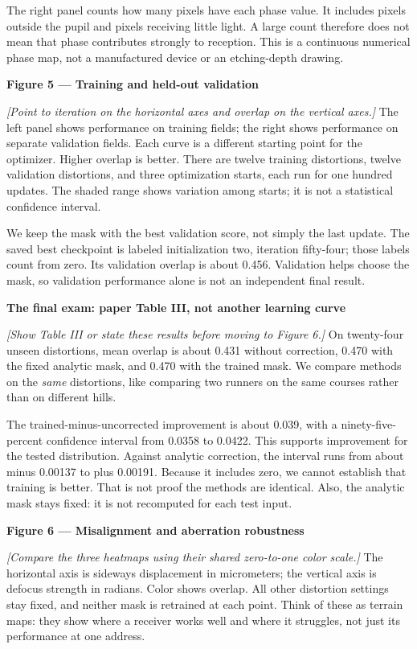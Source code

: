 \documentclass[11pt,letterpaper]{article}
\newcommand{\cue}[1]{\par\textbf{#1}\par}
\newcommand{\stage}[1]{\textit{[#1]}}
\begin{document}
The right panel counts how many pixels have each phase value. It includes pixels outside the pupil and pixels receiving little light. A large count therefore does not mean that phase contributes strongly to reception. This is a continuous numerical phase map, not a manufactured device or an etching-depth drawing.

\cue{Figure 5 --- Training and held-out validation}
\stage{Point to iteration on the horizontal axes and overlap on the vertical axes.}
The left panel shows performance on training fields; the right shows performance on separate validation fields. Each curve is a different starting point for the optimizer. Higher overlap is better. There are twelve training distortions, twelve validation distortions, and three optimization starts, each run for one hundred updates. The shaded range shows variation among starts; it is not a statistical confidence interval.

We keep the mask with the best validation score, not simply the last update. The saved best checkpoint is labeled initialization two, iteration fifty-four; those labels count from zero. Its validation overlap is about 0.456. Validation helps choose the mask, so validation performance alone is not an independent final result.

\cue{The final exam: paper Table III, not another learning curve}
\stage{Show Table III or state these results before moving to Figure 6.}
On twenty-four unseen distortions, mean overlap is about 0.431 without correction, 0.470 with the fixed analytic mask, and 0.470 with the trained mask. We compare methods on the \emph{same} distortions, like comparing two runners on the same courses rather than on different hills.

The trained-minus-uncorrected improvement is about 0.039, with a ninety-five-percent confidence interval from 0.0358 to 0.0422. This supports improvement for the tested distribution. Against analytic correction, the interval runs from about minus 0.00137 to plus 0.00191. Because it includes zero, we cannot establish that training is better. That is not proof the methods are identical. Also, the analytic mask stays fixed: it is not recomputed for each test input.

\cue{Figure 6 --- Misalignment and aberration robustness}
\stage{Compare the three heatmaps using their shared zero-to-one color scale.}
The horizontal axis is sideways displacement in micrometers; the vertical axis is defocus strength in radians. Color shows overlap. All other distortion settings stay fixed, and neither mask is retrained at each point. Think of these as terrain maps: they show where a receiver works well and where it struggles, not just its performance at one address.
\end{document}
